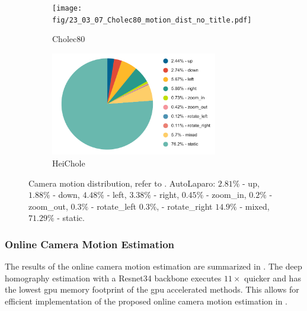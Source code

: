 \begin{figure}[htb]
    \centering
    \begin{subfigure}[b]{\textwidth}
        \centering
        \texttt{[image: fig/23\_03\_07\_Cholec80\_motion\_dist\_no\_title.pdf]}
        \caption{Cholec80}
    \end{subfigure}
    \hfill
    \centering
    \begin{subfigure}[b]{\textwidth}
        \centering
        \includegraphics[width=0.8\textwidth]{fig/23_03_07_HeiChole_motion_dist_no_title.pdf}
        \caption{HeiChole}
    \end{subfigure}
    \caption{Camera motion distribution, refer to . AutoLaparo: $2.81\%$ - up, $1.88\%$ - down, $4.48\%$ - left, $3.38\%$ - right, $0.45\%$ - zoom\_in, $0.2\%$ - zoom\_out, $0.3\%$ - rotate\_left $0.3\%$, - rotate\_right $14.9\%$ - mixed, $71.29\%$ - static.}
    \label{c4:fig:camera_motion_distribution}
\end{figure}

\subsubsection{Online Camera Motion Estimation}
The results of the online camera motion estimation are summarized in . The deep homography estimation with a Resnet34 backbone executes $11\times$ quicker and has the lowest \gls{gpu} memory footprint of the \gls{gpu} accelerated methods. This allows for efficient implementation of the proposed online camera motion estimation in .

